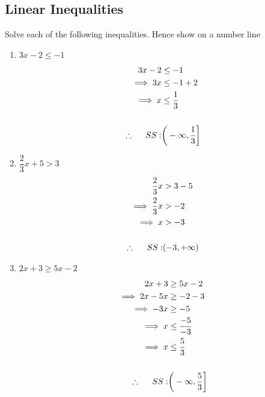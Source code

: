 \documentclass[11pt,a4paper]{article}
\begin{document}
\subsection{Linear Inequalities}
Solve each of the following inequalities. Hence show on a number line
\begin{enumerate}
\item[(a).] $3x-2\leq -1$
\begin{align*}
3x-2 &\leq -1\\
\implies 3x & \leq -1+2\\
\implies x & \leq \frac{1}{3}\\\\
\therefore\hspace{0.5cm} SS: & \bigg(-\infty,\frac{1}{3}\bigg]
\end{align*}




\begin{figure}[H]
\centering
{}
\end{figure}


\item[(b).] $\dfrac{2}{3}x+5>3$
\begin{align*}
\frac{2}{3}x &> 3-5\\
\implies \frac{2}{3}x & > -2\\
\implies x & > -3\\\\
\therefore \hspace{0.5cm} SS:& (-3,+\infty)
\end{align*}



\begin{figure}[H]
\centering
{}
\end{figure}


\item[(c).] $2x+3\geq 5x-2$
\begin{align*}
2x+3 & \geq 5x-2\\
\implies 2x-5x & \geq -2-3\\
\implies -3x & \geq -5\\
\implies x & \leq \frac{-5}{-3}\\
\implies x & \leq \frac{5}{3}\\\\
\therefore\hspace{0.5cm} SS:& \bigg(-\infty,\frac{5}{3}\bigg]
\end{align*}




\end{enumerate}
\end{document}
